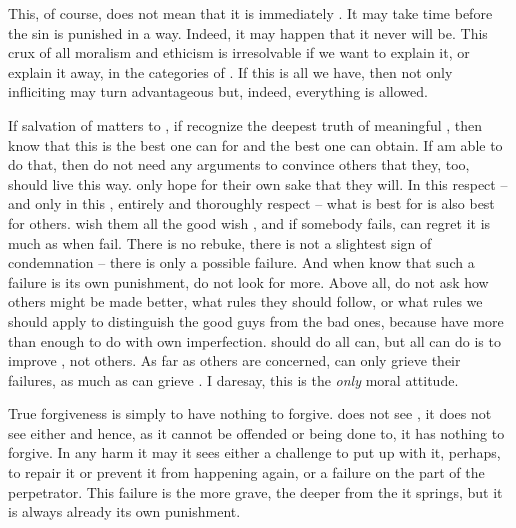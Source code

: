 {{This, of course, does not mean that it is immediately . It may take
time before the sin is punished in a  way. Indeed, it may 
happen that it never will be. This  crux of all moralism and ethicism 
is irresolvable if we want to explain it, or explain it away, in the 
categories of . If this is all we have, then not only 
infliciting  may turn advantageous but, indeed, everything is 
allowed.

\pa If salvation of  matters to , if 
recognize the deepest truth of meaningful , then
 know that this is the best one can  for and the best
one can obtain.  If  am able to do that, then  do not need
any arguments to convince others that they, too, should live this way. 
 only hope for their own sake that they will.  In this respect
-- and only in this , entirely  and thoroughly
 respect -- what is best for  is also best for
others.   wish them all the good  wish , and if
somebody fails,  can regret it is much as when 
fail.  There is no rebuke, there is not a slightest sign of
condemnation -- there is only a possible failure.  And when 
know that such a failure is its own punishment,  do not look for
more.  Above all,  do not ask how others might be made better,
what rules they should follow, or what rules we should apply to
distinguish the good guys from the bad ones, because  have more
than enough to do with  own imperfection.  should do all 
 can, but all  can do is to improve , not 
others. As far as others are concerned,  can only grieve their 
failures, as much as  can grieve .
I daresay, this is the {\em only} moral attitude.

\pa %
True forgiveness is simply to have nothing to forgive.   does
not see , it does not see  either and hence, as it
cannot be offended or being done  to, it has nothing to
forgive.  In any harm it may  it sees either a
challenge to put up with it, perhaps, to repair it or prevent it from
happening again, or a failure on the part of the perpetrator.  This
failure is the more grave, the deeper from the  it springs,
but it is always already its own punishment.

}}
